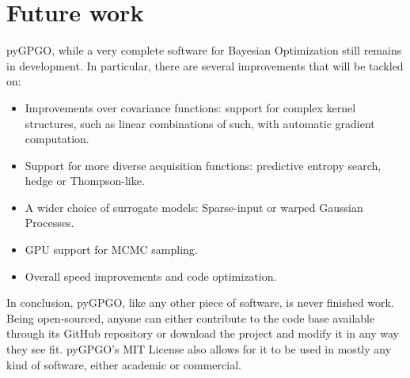 \documentclass[10pt,a4paper,twoside]{book}
\begin{document}
\newpage
\section{Future work}

pyGPGO, while a very complete software for Bayesian Optimization still remains in development. In particular, there are several improvements that will be tackled on:

\begin{itemize}
	\item Improvements over covariance functions: support for complex kernel structures, such as linear combinations of such, with automatic gradient computation.
	\item Support for more diverse acquisition functions: predictive entropy search, hedge or Thompson-like.
	\item A wider choice of surrogate models: Sparse-input or warped Gaussian Processes. 
	\item GPU support for MCMC sampling.
	\item Overall speed improvements and code optimization. 
\end{itemize}

In conclusion, pyGPGO, like any other piece of software, is never finished work. Being open-sourced, anyone can either contribute to the code base available through its GitHub repository or download the project and modify it in any way they see fit. pyGPGO's MIT License also allows for it to be used in mostly any kind of software, either academic or commercial.

\printbibliography
\end{document}
